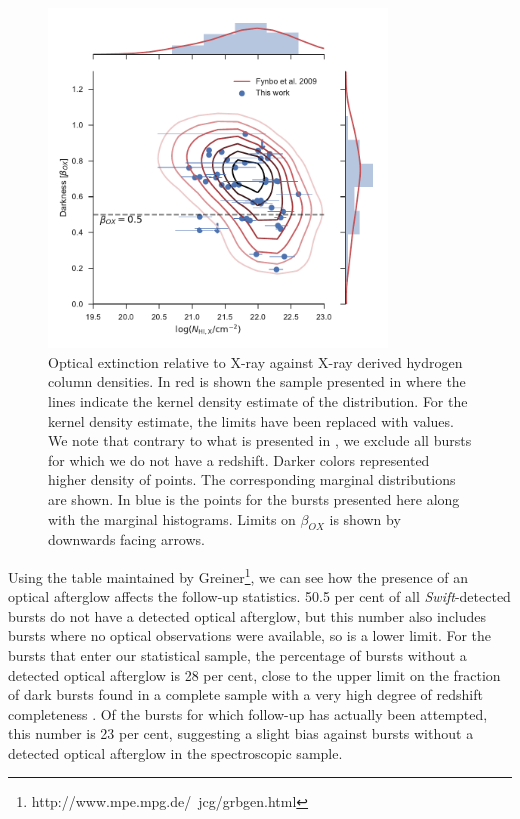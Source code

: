 \documentclass{aa}    %
\begin{document}
\begin{figure}[!ht]
	\centerline{\includegraphics[width=9cm]{figures/betaOX.pdf}} \caption{Optical
	extinction relative to X-ray against X-ray derived hydrogen column densities.
	In red is shown the sample presented in \citet{Fynbo2009} where the lines
	indicate the kernel density estimate of the distribution. For the kernel
	density estimate, the limits have been replaced with values. We note that
	contrary to what is presented in \citet{Fynbo2009}, we exclude all bursts for
	which we do not have a redshift. Darker colors represented higher density of
	points. The corresponding marginal distributions are shown. In blue is the
	points for the bursts presented here along with the marginal histograms. Limits
	on $\beta_{OX}$ is shown by downwards facing arrows.} \label{fig:betaOX}
\end{figure}

Using the table maintained by
Greiner\footnote{http://www.mpe.mpg.de/~jcg/grbgen.html}, we can see how the
presence of an optical afterglow affects the follow-up statistics. 50.5 per cent
of all \textit{Swift}-detected bursts do not have a detected optical afterglow,
but this number also includes bursts where no optical observations were
available, so is a lower limit. For the bursts that enter our statistical
sample, the percentage of bursts without a detected optical afterglow is 28 per
cent, close to the upper limit on the fraction of dark bursts found in a
complete sample with a very high degree of redshift completeness
\citep{Melandri2012}. Of the bursts for which follow-up has actually been
attempted, this number is 23 per cent, suggesting a slight bias against
bursts without a detected optical afterglow in the spectroscopic sample. 
\end{document}
